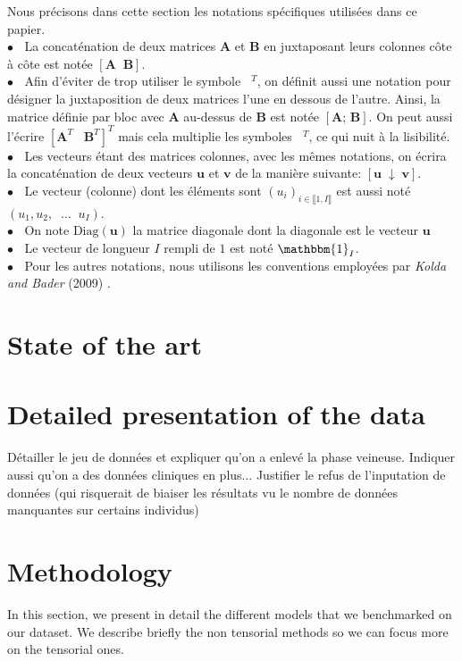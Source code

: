 \documentclass[10pt]{article}
\begin{document}
Nous précisons dans cette section les notations spécifiques utilisées dans ce papier. \\[5 pt]
\noindent $\bullet \; \;$ La concaténation de deux matrices $\mathbf{A}$ et $\mathbf{B}$ en juxtaposant leurs colonnes côte à côte est notée $[\mathbf{A}  \; \; \mathbf{B}]$.\\
$\bullet \; \;$ Afin d'éviter de trop utiliser le symbole $\phantom{a}^T$, on définit aussi une notation pour désigner la juxtaposition de deux matrices l'une en dessous de l'autre. Ainsi, la matrice définie par bloc avec $\mathbf{A}$ au-dessus de $\mathbf{B}$ est notée $\left[\mathbf{A}; \, \mathbf{B}\right]$. On peut aussi l'écrire $[\mathbf{A}^T \; \; \; \mathbf{B}^T]^T$ mais cela multiplie les symboles $\phantom{a}^T$, ce qui nuit à la lisibilité. \\
$\bullet \; \;$ Les vecteurs étant des matrices colonnes, avec les mêmes notations, on écrira la concaténation de deux vecteurs $\mathbf{u}$ et $\mathbf{v}$ de la manière suivante: $[\mathbf{u} \; \downarrow \;\mathbf{v}]$.  \\
$\bullet \; \;$ Le vecteur (colonne) dont les éléments sont $(u_i)_{i \in \llbracket 1, I\rrbracket}$ est aussi noté $(u_1, u_2, \; \; \hdots \;\; u_I)$. \\
$\bullet \; \;$ On note $\text{Diag}(\mathbf{u})$ la matrice diagonale dont la diagonale est le vecteur $\mathbf{u}$ \\
$\bullet \; \;$ Le vecteur de longueur $I$ rempli de $1$ est noté $\mathbbm{1}_I$.\\
$\bullet \; \;$ Pour les autres notations, nous utilisons les conventions employées par \textit{Kolda and Bader} (2009) \cite{conventions}.

\section{State of the art}
\blindtext

\section{Detailed presentation of the data}
Détailler le jeu de données et expliquer qu'on a enlevé la phase veineuse. Indiquer aussi qu'on a des données cliniques en plus... Justifier le refus de l'inputation de données (qui risquerait de biaiser les résultats vu le nombre de données manquantes sur certains individus)


\section{Methodology}
\noindent In this section, we present in detail the different models that we benchmarked on our dataset. We describe briefly the non tensorial methods so we can focus more on the tensorial ones.
\end{document}
